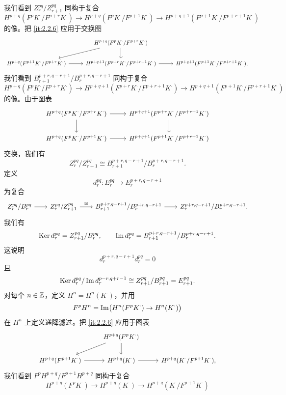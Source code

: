 我们看到 $Z_r^{pq}/Z_{r+1}^{pq}$ 同构于复合
\[
H^{p+q}(F^pK^{\cdot}/F^{p+r}K^{\cdot})\to H^{p+q}(F^pK^{\cdot}/F^{p+1}K^{\cdot})\to H^{p+q+1}(F^{p+1}K^{\cdot}/F^{p+r+1}K^{\cdot})
\]
的像。把 \ref{it:2.2.6} 应用于交换图
\[\begin{tikzcd}[column sep=2.4em,row sep=1.7em,cells={nodes={font=\small}}]
& H^{p+q}(F^pK^{\cdot}/F^{p+r}K^{\cdot}) \arrow[dl] \arrow[d] & \\
H^{p+q}(F^{p+1}K^{\cdot}/F^{p+r}K^{\cdot}) \arrow[r] & H^{p+q+1}(F^{p+r}K^{\cdot}/F^{p+r+1}K^{\cdot}) \arrow[r] & H^{p+q+1}(F^{p+1}K^{\cdot}/F^{p+r+1}K^{\cdot}),
\end{tikzcd}\]
我们看到 $B_{r+1}^{p+r,q-r+1}/B_r^{p+r,q-r+1}$ 同构于复合
\[
H^{p+q}(F^pK^{\cdot}/F^{p+r}K^{\cdot})\to H^{p+q+1}(F^{p+r}K^{\cdot}/F^{p+r+1}K^{\cdot})\to H^{p+q+1}(F^{p+1}K^{\cdot}/F^{p+r+1}K^{\cdot})
\]
的像。由于图表
\[\begin{tikzcd}[column sep=2.4em,row sep=1.9em,cells={nodes={font=\small}}]
H^{p+q}(F^pK^{\cdot}/F^{p+r}K^{\cdot}) \arrow[r] \arrow[d] & H^{p+q+1}(F^{p+r}K^{\cdot}/F^{p+r+1}K^{\cdot}) \arrow[d] \\
H^{p+q}(F^pK^{\cdot}/F^{p+1}K^{\cdot}) \arrow[r] & H^{p+q+1}(F^{p+1}K^{\cdot}/F^{p+r+1}K^{\cdot})
\end{tikzcd}\]
交换，我们有
\[
Z_r^{pq}/Z_{r+1}^{pq}\cong B_{r+1}^{p+r,q-r+1}/B_r^{p+r,q-r+1}.
\]
定义
\[
d_r^{pq}\colon E_r^{pq}\to E_r^{p+r,q-r+1}
\]
为复合
\[\begin{tikzcd}[column sep=2.0em,row sep=1.6em]
Z_r^{pq}/B_r^{pq} \arrow[r] & Z_r^{pq}/Z_{r+1}^{pq} \arrow[r,"\cong"] & B_{r+1}^{p+r,q-r+1}/B_r^{p+r,q-r+1} \arrow[r] & Z_r^{p+r,q-r+1}/B_r^{p+r,q-r+1}.
\end{tikzcd}\]
我们有
\[
\operatorname{Ker} d_r^{pq}=Z_{r+1}^{pq}/B_r^{pq},\qquad \operatorname{Im} d_r^{pq}=B_{r+1}^{p+r,q-r+1}/B_r^{p+r,q-r+1}.
\]
这说明
\[
d_r^{p+r,q-r+1}d_r^{pq}=0
\]
且
\[
\operatorname{Ker} d_r^{pq}/\operatorname{Im} d_r^{p-r,q+r-1}\cong Z_{r+1}^{pq}/B_{r+1}^{pq}=E_{r+1}^{pq}.
\]
对每个 $n\in\mathbb{Z}$，定义 $H^n=H^n(K^{\cdot})$，并用
\[
F^pH^n=\operatorname{Im}\bigl(H^n(F^pK^{\cdot})\to H^n(K^{\cdot})\bigr)
\]
在 $H^n$ 上定义递降滤过。把 \ref{it:2.2.6} 应用于图表
\[\begin{tikzcd}[column sep=2.4em,row sep=1.7em,cells={nodes={font=\small}}]
& H^{p+q}(F^pK^{\cdot}) \arrow[dl] \arrow[d] & \\
H^{p+q}(F^{p+1}K^{\cdot}) \arrow[r] & H^{p+q}(K^{\cdot}) \arrow[r] & H^{p+q}(K^{\cdot}/F^{p+1}K^{\cdot}),
\end{tikzcd}\]
我们看到 $F^pH^{p+q}/F^{p+1}H^{p+q}$ 同构于复合
\[
H^{p+q}(F^pK^{\cdot})\to H^{p+q}(K^{\cdot})\to H^{p+q}(K^{\cdot}/F^{p+1}K^{\cdot})
\]
